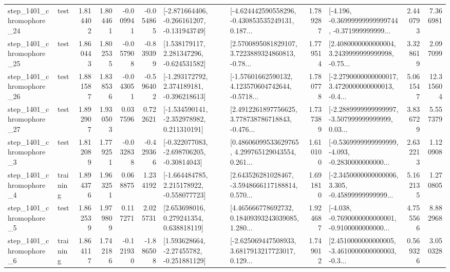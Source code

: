 \begin{tabular}{llrrrrllrlrr}
 step\_1401\_chromophore\_24 &      test &      1.814402 &    1.804461 &     -0.009941 & -0.054865 &  [-2.871664406, -0.266161207, -0.131943749] &  [-4.624442590558296, -0.430853535249131, 0.187... &       1.789287 &  [-4.196, -0.36999999999999744, -0.371999999999... &            2.440793 &          7.366981 \\
 step\_1401\_chromophore\_25 &      test &      1.860443 &    1.802535 &     -0.057908 & -0.839399 &    [1.538179117, 2.281347296, -0.624531582] &  [2.5700895081829107, 3.7223889324860813, -0.78... &       1.779514 &  [2.4080000000000004, 3.2439999999999998, -0.75... &            3.328619 &          2.097099 \\
 step\_1401\_chromophore\_26 &      test &      1.881587 &    1.838536 &     -0.043051 & -0.596402 &   [-1.293172792, 2.374189181, -0.396218613] &  [-1.57601662590132, 4.123570604742644, -0.5718... &       1.780778 &  [-2.2790000000000017, 3.4720000000000013, -0.4... &            5.061547 &         12.315604 \\
 step\_1401\_chromophore\_27 &      test &      1.892907 &    1.930503 &      0.037596 &  0.722621 &   [-1.534590141, -2.352978982, 0.211310191] &  [2.4912261897756625, 3.778738786718843, -0.476... &       1.737389 &  [-2.2889999999999997, -3.507999999999999, 0.03... &            3.836729 &          5.557379 \\
  step\_1401\_chromophore\_3 &      test &      1.812089 &    1.779251 &     -0.032838 & -0.429366 &   [-0.322077083, -2.698706205, -0.30814043] &  [0.48606099533629765, 4.299765129043554, 0.261... &       1.610100 &  [-0.5369999999999999, -4.093, -0.2830000000000... &            2.632213 &          1.120908 \\
  step\_1401\_chromophore\_4 &  training &      1.894376 &    1.963251 &      0.068875 &  1.234192 &   [-1.664484785, 2.215178922, -0.558077723] &  [2.643526281028467, -3.5948666117188814, 0.570... &       1.691810 &  [-2.3450000000000006, 3.305, -0.45899999999999... &            5.162135 &          1.270805 \\
  step\_1401\_chromophore\_5 &      test &      1.862539 &    1.979809 &      0.117271 &  2.025731 &     [2.653698016, 0.279241354, 0.638818119] &  [4.465666778692732, 0.18409393243039085, 1.280... &       1.924687 &  [-4.038, -0.7690000000000001, -0.9100000000000... &            4.755566 &          8.882968 \\
  step\_1401\_chromophore\_6 &  training &      1.864117 &    1.742186 &     -0.121930 & -1.886508 &    [1.593628664, -2.27455782, -0.251881129] &  [-2.625069447508933, 3.6817913217723017, 0.129... &       1.749012 &  [2.4510000000000005, -3.4610000000000003, -0.3... &            0.569326 &          3.050328 \\

\end{tabular}
